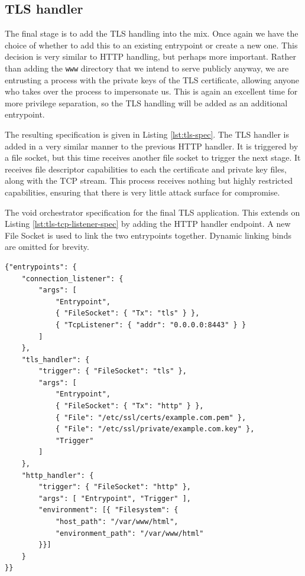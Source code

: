 \documentclass[12pt,a4paper,twoside]{report}
\begin{document}
\subsection{TLS handler}
\label{sec:building-tls-tls-handler}

The final stage is to add the TLS handling into the mix. Once again we have the choice of whether to add this to an existing entrypoint or create a new one. This decision is very similar to HTTP handling, but perhaps more important. Rather than adding the \texttt{www} directory that we intend to serve publicly anyway, we are entrusting a process with the private keys of the TLS certificate, allowing anyone who takes over the process to impersonate us. This is again an excellent time for more privilege separation, so the TLS handling will be added as an additional entrypoint.

The resulting specification is given in Listing \ref{lst:tls-spec}. The TLS handler is added in a very similar manner to the previous HTTP handler. It is triggered by a file socket, but this time receives another file socket to trigger the next stage. It receives file descriptor capabilities to each the certificate and private key files, along with the TCP stream. This process receives nothing but highly restricted capabilities, ensuring that there is very little attack surface for compromise.

\begin{listing}
\label{lst:tls-spec}
\caption{The void orchestrator specification for the final TLS application. This extends on Listing \ref{lst:tls-tcp-listener-spec} by adding the HTTP handler endpoint. A new File Socket is used to link the two entrypoints together. Dynamic linking binds are omitted for brevity.}

\begin{verbatim}
{"entrypoints": {
    "connection_listener": {
        "args": [
            "Entrypoint",
            { "FileSocket": { "Tx": "tls" } },
            { "TcpListener": { "addr": "0.0.0.0:8443" } }
        ]
    },
    "tls_handler": {
        "trigger": { "FileSocket": "tls" },
        "args": [
            "Entrypoint",
            { "FileSocket": { "Tx": "http" } },
            { "File": "/etc/ssl/certs/example.com.pem" },
            { "File": "/etc/ssl/private/example.com.key" },
            "Trigger"
        ]
    },
    "http_handler": {
        "trigger": { "FileSocket": "http" },
        "args": [ "Entrypoint", "Trigger" ],
        "environment": [{ "Filesystem": {
            "host_path": "/var/www/html",
            "environment_path": "/var/www/html"
        }}]
    }
}}
\end{verbatim}
\end{listing}
\end{document}
